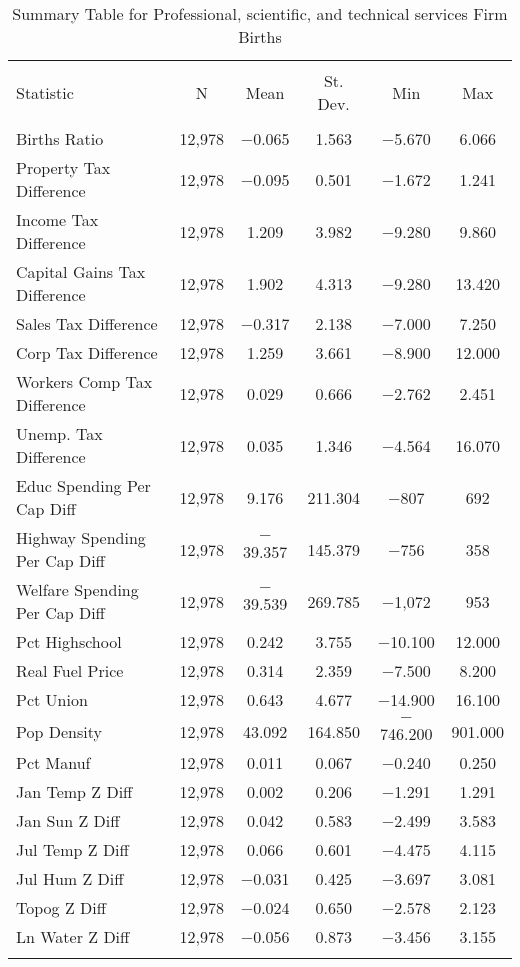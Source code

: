 
\begin{table}[!htbp] \centering 
  \caption{Summary Table for  Professional, scientific, and technical services Firm Births} 
  \label{54summary} 
\begin{tabular}{@{\extracolsep{5pt}}lccccc} 
\\[-1.8ex]\hline 
\hline \\[-1.8ex] 
Statistic & \multicolumn{1}{c}{N} & \multicolumn{1}{c}{Mean} & \multicolumn{1}{c}{St. Dev.} & \multicolumn{1}{c}{Min} & \multicolumn{1}{c}{Max} \\ 
\hline \\[-1.8ex] 
Births Ratio & 12,978 & $-$0.065 & 1.563 & $-$5.670 & 6.066 \\ 
Property Tax Difference & 12,978 & $-$0.095 & 0.501 & $-$1.672 & 1.241 \\ 
Income Tax Difference & 12,978 & 1.209 & 3.982 & $-$9.280 & 9.860 \\ 
Capital Gains Tax Difference & 12,978 & 1.902 & 4.313 & $-$9.280 & 13.420 \\ 
Sales Tax Difference & 12,978 & $-$0.317 & 2.138 & $-$7.000 & 7.250 \\ 
Corp Tax Difference & 12,978 & 1.259 & 3.661 & $-$8.900 & 12.000 \\ 
Workers Comp Tax Difference & 12,978 & 0.029 & 0.666 & $-$2.762 & 2.451 \\ 
Unemp. Tax Difference & 12,978 & 0.035 & 1.346 & $-$4.564 & 16.070 \\ 
Educ Spending Per Cap Diff & 12,978 & 9.176 & 211.304 & $-$807 & 692 \\ 
Highway Spending Per Cap Diff & 12,978 & $-$39.357 & 145.379 & $-$756 & 358 \\ 
Welfare Spending Per Cap Diff & 12,978 & $-$39.539 & 269.785 & $-$1,072 & 953 \\ 
Pct Highschool & 12,978 & 0.242 & 3.755 & $-$10.100 & 12.000 \\ 
Real Fuel Price & 12,978 & 0.314 & 2.359 & $-$7.500 & 8.200 \\ 
Pct Union & 12,978 & 0.643 & 4.677 & $-$14.900 & 16.100 \\ 
Pop Density & 12,978 & 43.092 & 164.850 & $-$746.200 & 901.000 \\ 
Pct Manuf & 12,978 & 0.011 & 0.067 & $-$0.240 & 0.250 \\ 
Jan Temp Z Diff & 12,978 & 0.002 & 0.206 & $-$1.291 & 1.291 \\ 
Jan Sun Z Diff & 12,978 & 0.042 & 0.583 & $-$2.499 & 3.583 \\ 
Jul Temp Z Diff & 12,978 & 0.066 & 0.601 & $-$4.475 & 4.115 \\ 
Jul Hum Z Diff & 12,978 & $-$0.031 & 0.425 & $-$3.697 & 3.081 \\ 
Topog Z Diff & 12,978 & $-$0.024 & 0.650 & $-$2.578 & 2.123 \\ 
Ln Water Z Diff & 12,978 & $-$0.056 & 0.873 & $-$3.456 & 3.155 \\ 
\hline \\[-1.8ex] 
\end{tabular} 
\end{table} 

